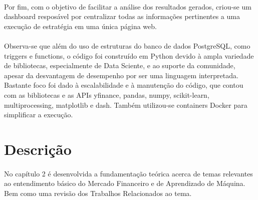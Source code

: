 \paragraph{} Por fim, com o objetivo de facilitar a análise dos resultados gerados, criou-se um dashboard resposável por centralizar todas as informações pertinentes a uma execução de estratégia em uma única página web.

\paragraph{} Observa-se que além do uso de estruturas do banco de dados PostgreSQL, como triggers e functions, o código foi construído em Python devido à ampla variedade de bibliotecas, especialmente de Data Sciente, e ao suporte da comunidade, apesar da desvantagem de desempenho por ser uma linguagem interpretada. Bastante foco foi dado à escalabilidade e à manutenção do código, que contou com as bibliotecas e as APIs yfinance, pandas, numpy, scikit-learn, multiprocessing, matplotlib e dash. Também utilizou-se containers Docker para simplificar a execução.

\section{Descrição}

\paragraph{} No capítulo 2 é desenvolvida a fundamentação teórica acerca de temas relevantes ao entendimento básico do Mercado Financeiro e de Aprendizado de Máquina. Bem como uma revisão dos Trabalhos Relacionados ao tema.
